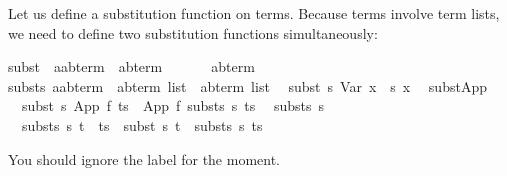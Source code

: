 \begin{isabellebody}
\begin{isamarkuptext}
Let us define a substitution function on terms. Because terms involve term
lists, we need to define two substitution functions simultaneously:%
\end{isamarkuptext}%
\isanewline
subst\ {\isacharcolon}{\isacharcolon}\ {\isachardoublequote}{\isacharparenleft}{\isacharprime}a{\isasymRightarrow}{\isacharparenleft}{\isacharprime}a{\isacharcomma}{\isacharprime}b{\isacharparenright}term{\isacharparenright}\ {\isasymRightarrow}\ {\isacharparenleft}{\isacharprime}a{\isacharcomma}{\isacharprime}b{\isacharparenright}term\ \ \ \ \ \ {\isasymRightarrow}\ {\isacharparenleft}{\isacharprime}a{\isacharcomma}{\isacharprime}b{\isacharparenright}term{\isachardoublequote}\isanewline
substs{\isacharcolon}{\isacharcolon}\ {\isachardoublequote}{\isacharparenleft}{\isacharprime}a{\isasymRightarrow}{\isacharparenleft}{\isacharprime}a{\isacharcomma}{\isacharprime}b{\isacharparenright}term{\isacharparenright}\ {\isasymRightarrow}\ {\isacharparenleft}{\isacharprime}a{\isacharcomma}{\isacharprime}b{\isacharparenright}term\ list\ {\isasymRightarrow}\ {\isacharparenleft}{\isacharprime}a{\isacharcomma}{\isacharprime}b{\isacharparenright}term\ list{\isachardoublequote}\isanewline
\isanewline
{}\isanewline
\ \ {\isachardoublequote}subst\ s\ {\isacharparenleft}Var\ x{\isacharparenright}\ {\isacharequal}\ s\ x{\isachardoublequote}\isanewline
\ \ subst{\isacharunderscore}App{\isacharcolon}\isanewline
\ \ {\isachardoublequote}subst\ s\ {\isacharparenleft}App\ f\ ts{\isacharparenright}\ {\isacharequal}\ App\ f\ {\isacharparenleft}substs\ s\ ts{\isacharparenright}{\isachardoublequote}\isanewline
\isanewline
\ \ {\isachardoublequote}substs\ s\ {\isacharbrackleft}{\isacharbrackright}\ {\isacharequal}\ {\isacharbrackleft}{\isacharbrackright}{\isachardoublequote}\isanewline
\ \ {\isachardoublequote}substs\ s\ {\isacharparenleft}t\ {\isacharhash}\ ts{\isacharparenright}\ {\isacharequal}\ subst\ s\ t\ {\isacharhash}\ substs\ s\ ts{\isachardoublequote}%
\begin{isamarkuptext}%
\noindent
You should ignore the label  for the moment.


\end{isamarkuptext}
\end{isabellebody}
